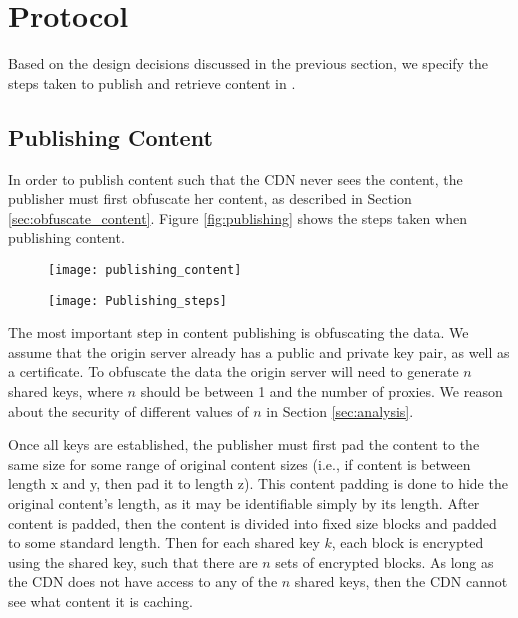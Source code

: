 \section{\system{} Protocol}
\label{sec:protocol}
Based on the design decisions discussed in the previous section, we specify the 
steps taken to publish and retrieve content in \system{}.

\subsection{Publishing Content}
\label{sec:publish_protocol}
In order to publish content such that the CDN never sees the content, the publisher 
must first obfuscate her content, as described in Section \ref{sec:obfuscate_content}. 
Figure \ref{fig:publishing} shows the steps taken when publishing content.

\begin{figure*}[t]
    \centering
    \begin{subfigure}[h]{0.5\textwidth}
        \texttt{[image: publishing\_content]}
    \end{subfigure}%
    \begin{subfigure}[h]{0.5\textwidth}
        \texttt{[image: Publishing\_steps]}
    \end{subfigure}
    \caption{Step-by-step instructions on how content is published in \system{}.}
    \label{fig:publishing}
\end{figure*}

The most important step in content publishing is obfuscating the data.  We assume that the origin 
server already has a public and private key pair, as well as a certificate.  To obfuscate the data 
the origin server will need to generate $n$ shared keys, where $n$ should be between 1 and the number of 
proxies.  We reason about the security of different values of $n$ in Section \ref{sec:analysis}.  

Once all keys are established, the publisher must first pad the content to the same size for some 
range of original content sizes (i.e., if content is between length x and y, then pad it to length 
z).  This content padding is done to hide the original content's length, as it may be identifiable 
simply by its length.  After content is padded, then the content is divided into fixed size blocks and padded to 
some standard length.  Then for each shared key $k$, each block is encrypted using the shared key, 
such that there are $n$ sets of encrypted blocks. As long as the CDN does not have access to any 
of the $n$ shared keys, then the CDN cannot see what content it is caching.  


